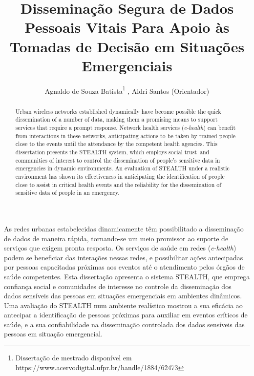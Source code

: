 \documentclass[12pt]{article}
\title{Disseminação Segura de Dados Pessoais Vitais Para Apoio às Tomadas de Decisão em Situações Emergenciais}
\author{Agnaldo de Souza Batista\inst{1}\thanks{{Dissertação de mestrado disponível em https://www.acervodigital.ufpr.br/handle/1884/62473}}\,\,, Aldri Santos\inst{1} (Orientador)}
\newcommand{\agn}[1]{\textcolor{auburn}{#1}}
\begin{document}
 
\pagestyle{myheadings} %
\maketitle

\begin{abstract}
Urban wireless networks established dynamically have become possible the quick dissemination of a number of data, making them a promising means to support services that require a prompt response. Network health services (\textit{e-health})
can benefit from interactions in these networks, 
anticipating
actions to be taken by trained people close to the events until the attendance by the competent health agencies. This dissertation presents the \mbox{STEALTH} system, which employs social trust~and communities of interest to control the dissemination of people's sensitive data in emergencies in dynamic environments. An evaluation of \mbox{STEALTH} under a realistic environment has shown its effectiveness in anticipating the identification of people close to assist in critical health events and the reliability for the dissemination of sensitive data of people in an emergency.

\end{abstract}


\begin{resumo} 

As redes urbanas estabelecidas dinamicamente têm possibilitado a disseminação de dados de maneira rápida, tornando-se um meio promissor ao suporte de serviços que exigem pronta resposta. Os serviços de saúde em redes (\textit{e-health}) 
podem se beneficiar das interações nessas redes, 
e possibilitar ações antecipadas por pessoas capacitadas próximas aos eventos até o atendimento pelos órgãos de saúde competentes. Esta dissertação apresenta o sistema \mbox{STEALTH}, 
que emprega confiança social e comunidades de interesse no controle da disseminação dos dados sensíveis das pessoas em situações emergenciais em ambientes dinâmicos. Uma avaliação do \mbox{STEALTH} num ambiente realístico mostrou a sua eficácia ao antecipar a identificação de pessoas próximas para auxiliar em eventos críticos de saúde, e a sua confiabilidade na disseminação controlada dos dados sensíveis das pessoas em situação emergencial.

\end{resumo}
\end{document}
